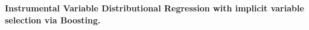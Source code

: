 \documentclass[12pt]{article}
\begin{document}


 


\thispagestyle{empty}
\begin{center}
    \large
    \textbf{Instrumental Variable Distributional Regression with implicit variable selection via Boosting.}
    \vspace{0.03cm}
    
    \large    
    \vspace{0.03cm}
\end{center}

\end{document}
